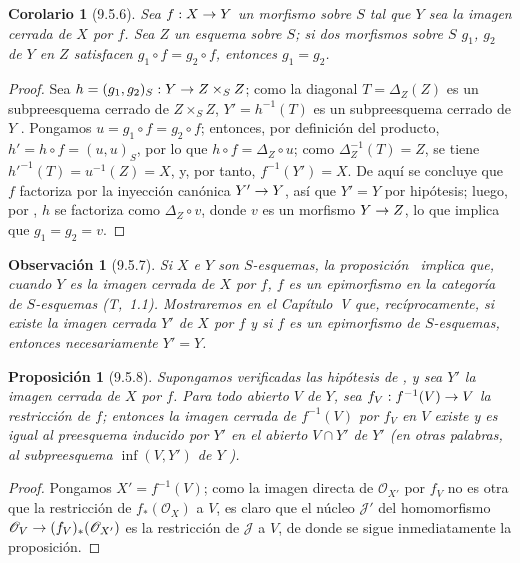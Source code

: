 \documentclass[oneside]{amsart}
\theoremstyle{ega-env-style}
\theoremstyle{ega-thm-env-style}
\newtheorem*{proposition}{Proposición}
\newtheorem*{corollary}{Corolario}
\theoremstyle{ega-defn-env-style}
\newtheorem*{remark}{Observación}
\renewcommand{\to}{\mathchoice{\longrightarrow}{\rightarrow}{\rightarrow}{\rightarrow}}
\newcommand{\oldpage}[2][]{{\marginnote{\normalfont{\textbf{#1}~|~#2}}}\ignorespaces}
\let\EGAOriginalLabel\label
\renewcommand{\label}[1]{\phantomsection\EGAOriginalLabel{#1}}
\begin{document}
\begin{corollary}[9.5.6]
\label{I.9.5.6}
Sea $f:X\to Y$ un morfismo sobre $S$ tal que $Y$ sea la imagen cerrada de $X$ por $f$.
Sea $Z$ un esquema sobre $S$; si dos morfismos sobre $S$ $g_1$, $g_2$ de $Y$ en $Z$
satisfacen $g_1\circ f=g_2\circ f$, entonces $g_1=g_2$.
\end{corollary}

\begin{proof}
Sea $h=(g_1,g_2)_S:Y\to Z\times_S Z$; como la diagonal $T=\Delta_Z(Z)$ es un
subpreesquema cerrado de $Z\times_S Z$, $Y'=h^{-1}(T)$ es un subpreesquema cerrado de $Y$
. Pongamos $u=g_1\circ f=g_2\circ f$; entonces, por definición del producto,
$h'=h\circ f=(u,u)_S$, por lo que $h\circ f=\Delta_Z\circ u$; como
$\Delta_Z^{-1}(T)=Z$, se tiene $h'^{-1}(T)=u^{-1}(Z)=X$, y, por tanto, $f^{-1}(Y')=X$.
De aquí se concluye  que $f$ factoriza por la inyección canónica $Y'\to Y$,
así que $Y'=Y$ por hipótesis; luego, por , $h$ se factoriza como
$\Delta_Z\circ v$, donde $v$ es un morfismo $Y\to Z$, lo que implica que $g_1=g_2=v$.
\end{proof}

\begin{remark}[9.5.7]
\label{I.9.5.7}
Si $X$ e $Y$ son $S$-esquemas, la proposición~ implica que,
\oldpage[I]{178}
cuando $Y$ es la imagen cerrada de $X$ por $f$, $f$ es un \emph{epimorfismo} en la categoría de $S$-\emph{esquemas} (T,~1.1).
Mostraremos en el Capítulo~V que, recíprocamente, si existe la imagen cerrada $Y'$ de $X$
por $f$ y si $f$ es un epimorfismo de $S$-esquemas, entonces necesariamente $Y'=Y$.
\end{remark}

\begin{proposition}[9.5.8]
\label{I.9.5.8}
Supongamos verificadas las hipótesis de , y sea $Y'$ la imagen cerrada de $X$ por $f$. Para todo abierto $V$ de $Y$, sea
$f_V:f^{-1}(V)\to V$ la restricción de $f$; entonces la imagen cerrada de
$f^{-1}(V)$ por $f_V$ en $V$ existe y es igual al preesquema inducido por
$Y'$ en el abierto $V\cap Y'$ de $Y'$ \textup{(en otras palabras, al subpreesquema
$\inf(V,Y')$ de $Y$ )}.
\end{proposition}

\begin{proof}
Pongamos $X'=f^{-1}(V)$; como la imagen directa de $\mathscr{O}_{X'}$ por
$f_V$ no es otra que la restricción de $f_*(\mathscr{O}_X)$ a $V$, es claro
que el núcleo $\mathscr{J}'$ del homomorfismo
$\mathscr{O}_V\to(f_V)_*(\mathscr{O}_{X'})$ es la restricción de
$\mathscr{J}$ a $V$, de donde se sigue inmediatamente la proposición.
\end{proof}
\end{document}
